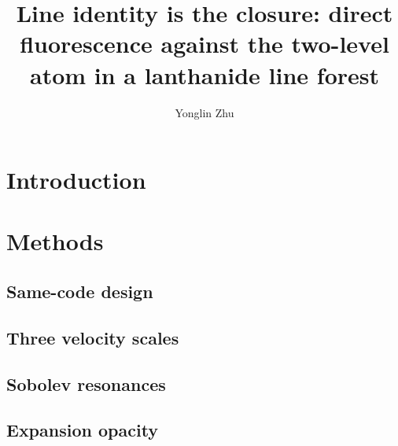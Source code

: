 \documentclass[fleqn,usenatbib]{mnras}
\title[No scalar thermalisation reproduces lanthanide fluorescence]{Line identity is the closure: direct fluorescence against the two-level atom in a lanthanide line forest}
\author[Y. Zhu]{Yonglin Zhu}
\begin{document}
\maketitle

\begin{abstract}
\end{abstract}

\section{Introduction}

\section{Methods}
\subsection{Same-code design}            %
\subsection{Three velocity scales}        %
\subsection{Sobolev resonances}           %
\subsection{Expansion opacity}            %
\end{document}
